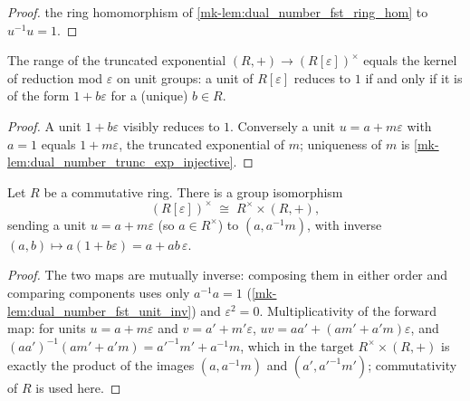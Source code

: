 \begin{proof}
  \leanokApply the ring homomorphism of
  \ref{mk-lem:dual_number_fst_ring_hom} to \(u^{-1} u = 1\).
\end{proof}

\begin{lemma}\label{mk-lem:dual_number_trunc_exp_exact}
  \leanok

  The range of the truncated exponential
  \((R,+) \to (R[\varepsilon])^{\times}\) equals the kernel of
  reduction mod \(\varepsilon\) on unit groups: a unit of
  \(R[\varepsilon]\) reduces to \(1\) if and only if it is of the form
  \(1 + b\varepsilon\) for a (unique) \(b \in R\).
\end{lemma}

\begin{proof}
  \leanok{}
  A unit \(1 + b\varepsilon\) visibly reduces to \(1\). Conversely a
  unit \(u = a + m\varepsilon\) with \(a = 1\) equals
  \(1 + m\varepsilon\), the truncated exponential of \(m\);
  uniqueness of \(m\) is
  \ref{mk-lem:dual_number_trunc_exp_injective}.
\end{proof}

\begin{theorem}\label{mk-thm:dual_number_units_split}
  \leanok

  Let \(R\) be a commutative ring. There is a group isomorphism
  \[
    (R[\varepsilon])^{\times} \;\cong\; R^{\times} \times (R, +),
  \]
  sending a unit \(u = a + m\varepsilon\) (so \(a \in R^{\times}\)) to
  \((a, a^{-1}m)\), with inverse
  \((a, b) \mapsto a(1 + b\varepsilon) = a + ab\,\varepsilon\).
\end{theorem}

\begin{proof}
  \leanok{}
  The two maps are mutually inverse: composing them in either order and
  comparing components uses only
  \(a^{-1}a = 1\) (\ref{mk-lem:dual_number_fst_unit_inv}) and
  \(\varepsilon^2 = 0\). Multiplicativity of the forward map: for
  units \(u = a + m\varepsilon\) and \(v = a' + m'\varepsilon\),
  \(uv = aa' + (am' + a'm)\varepsilon\), and
  \((aa')^{-1}(am' + a'm) = a'^{-1}m' + a^{-1}m\), which in the target
  \(R^{\times} \times (R,+)\) is exactly the product of the images
  \((a, a^{-1}m)\) and \((a', a'^{-1}m')\); commutativity of \(R\) is
  used here.
\end{proof}

